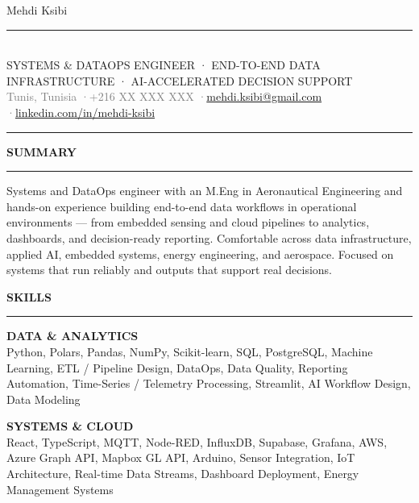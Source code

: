 \documentclass[10pt, a4paper]{article}
\newcommand{\cvsection}[1]{%
  \vspace{0pt}%
  {\fontsize{9}{10}\selectfont\bfseries
    \textcolor{accent}{\MakeUppercase{#1}}}\\[-2pt]%
  \textcolor{accent}{\rule{24pt}{1.5pt}}%
  \vspace{2pt}%
}
\newcommand{\sklabel}[1]{%
  {\fontsize{8.5}{9}\selectfont\bfseries\textcolor{accentlt}%
    {\MakeUppercase{#1}}}%
}
\begin{document}

\begin{center}
{\namefont\fontsize{25}{27}\selectfont Mehdi Ksibi}\\[3pt]
\textcolor{accent}{\rule{0.24\textwidth}{0.8pt}}\\[3pt]
{\fontsize{8}{8.5}\selectfont\textcolor{accent}%
  {SYSTEMS \& DATAOPS ENGINEER · END-TO-END DATA INFRASTRUCTURE · AI-ACCELERATED DECISION SUPPORT}}\\[3pt]
{\fontsize{9}{10}\selectfont\textcolor{graytext}{%
  Tunis, Tunisia
  \enspace·\enspace +216 XX XXX XXX
  \enspace·\enspace \href{mailto:mehdi.ksibi@gmail.com}{mehdi.ksibi@gmail.com}
  \enspace·\enspace \href{https://linkedin.com/in/mehdi-ksibi}{linkedin.com/in/mehdi-ksibi}}}
\end{center}
\vspace{0pt}
{\color{ruleclr}\hrule}
\vspace{2pt}

\cvsection{Summary}
{\fontsize{9}{11.5}\selectfont
Systems and DataOps engineer with an M.Eng in Aeronautical Engineering
and hands-on experience building end-to-end data workflows in operational
environments --- from embedded sensing and cloud pipelines to analytics,
dashboards, and decision-ready reporting. Comfortable across data
infrastructure, applied AI, embedded systems, energy engineering, and
aerospace. Focused on systems that run reliably and outputs that support
real decisions.}

\vspace{1pt}

\cvsection{Skills}

\sklabel{Data \& Analytics}\\
{\fontsize{9}{11}\selectfont
Python, Polars, Pandas, NumPy, Scikit-learn, SQL, PostgreSQL,
Machine Learning, ETL / Pipeline Design, DataOps, Data Quality,
Reporting Automation, Time-Series / Telemetry Processing, Streamlit,
AI Workflow Design, Data Modeling}

\vspace{1pt}
\sklabel{Systems \& Cloud}\\
{\fontsize{9}{11}\selectfont
React, TypeScript, MQTT, Node-RED, InfluxDB, Supabase, Grafana, AWS,
Azure Graph API, Mapbox GL API, Arduino, Sensor Integration,
IoT Architecture, Real-time Data Streams, Dashboard Deployment,
Energy Management Systems}
\end{document}
